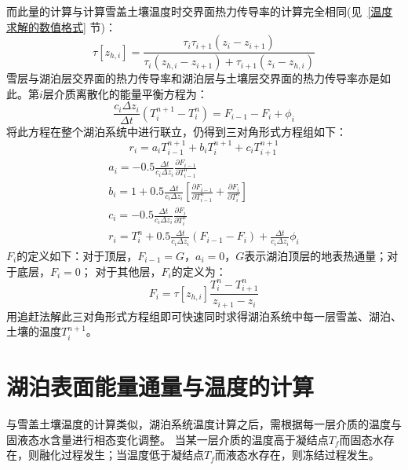 而此量的计算与计算雪盖土壤温度时交界面热力传导率的计算完全相同(见~\ref{温度求解的数值格式} 节)：
\begin{equation}
    \tau\left[z_{h,i}\right]=\frac{\tau_i\tau_{i+1}\left(z_i-z_{i+1}\right)}{\tau_i\left(z_{h,i}-z_{i+1}\right)
    +\tau_{i+1}\left(z_i-z_{h,i}\right)}
\end{equation}
雪层与湖泊层交界面的热力传导率和湖泊层与土壤层交界面的热力传导率亦是如此。第$i$层介质离散化的能量平衡方程为：
\begin{equation}
\frac{c_{i} \Delta z_{i}}{\Delta t}\left(T_{i}^{n+1}-T_{i}^{n}\right)=F_{i-1}-F_{i}+\phi_{i}
\end{equation}
将此方程在整个湖泊系统中进行联立，仍得到三对角形式方程组如下：
\begin{equation}
r_{i}=a_{i} T_{i-1}^{n+1}+b_{i} T_{i}^{n+1}+c_{i} T_{i+1}^{n+1}
\end{equation}
\begin{equation}
\begin{array}{c}a_{i}=-0.5 \frac{\Delta t}{c_{i} \Delta z_{i}}
     \frac{\partial F_{i-1}}{\partial T_{i-1}^{n}} \\ b_{i}=1+0.5 \frac{\Delta t}{c_{i} \Delta z_{i}}
     \left[\frac{\partial F_{i-1}}{\partial T_{i-1}^{n}}+\frac{\partial F_{i}}{\partial T_{i}^{n}}\right] \\
      c_{i}=-0.5 \frac{\Delta t}{c_{i} \Delta z_{i}} \frac{\partial F_{i}}{\partial T_{i}^{n}} \\ 
      r_{i}=T_{i}^{n}+0.5 \frac{\Delta t}{c_{i} \Delta z_{i}}\left(F_{i-1}-F_{i}\right)+\frac{\Delta t}{c_{i}
       \Delta z_{i}} \phi_{i}\end{array}
\end{equation}
$F_i$的定义如下：对于顶层，$F_{i-1}=G$，$a_i=0$，$G$表示湖泊顶层的地表热通量；对于底层，$F_i=0$；
对于其他层，$F_i$的定义为：
\begin{equation}
F_{i}=\tau\left[z_{h, i}\right] \frac{T_{i}^{n}-T_{i+1}^{n}}{z_{i+1}-z_{i}}
\end{equation}
用追赶法解此三对角形式方程组即可快速同时求得湖泊系统中每一层雪盖、湖泊、土壤的温度$T_i^{n+1}$。
\section{湖泊表面能量通量与温度的计算}\label{湖泊表面能量通量与温度的计算}
与雪盖土壤温度的计算类似，湖泊系统温度计算之后，需根据每一层介质的温度与固液态水含量进行相态变化调整。
当某一层介质的温度高于凝结点$T_f$而固态水存在，则融化过程发生；当温度低于凝结点$T_f$而液态水存在，则冻结过程发生。


